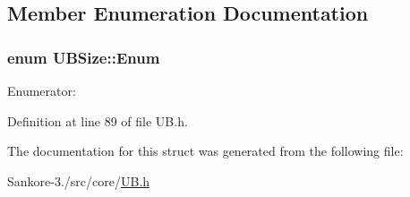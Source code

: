 \subsection{Member Enumeration Documentation}
\hypertarget{struct_u_b_size_a7ea37366b0131977382c1412689659a6}{
\subsubsection[{Enum}]{\setlength{\rightskip}{0pt plus 5cm}enum {\bf U\-B\-Size\-::\-Enum}}}\label{d5/d5e/struct_u_b_size_a7ea37366b0131977382c1412689659a6}
\begin{Desc}
\item[Enumerator\-: ]\par
\begin{description}
\item[{\em 
\hypertarget{struct_u_b_size_a7ea37366b0131977382c1412689659a6a0ac946f885859a3db87fef6e0a5411a6}{Small}\label{d5/d5e/struct_u_b_size_a7ea37366b0131977382c1412689659a6a0ac946f885859a3db87fef6e0a5411a6}
}]\item[{\em 
\hypertarget{struct_u_b_size_a7ea37366b0131977382c1412689659a6ac239b174a88775ab9862fc9043931d5d}{Medium}\label{d5/d5e/struct_u_b_size_a7ea37366b0131977382c1412689659a6ac239b174a88775ab9862fc9043931d5d}
}]\item[{\em 
\hypertarget{struct_u_b_size_a7ea37366b0131977382c1412689659a6af6e3d630c31d154e199dc809a08f9ea4}{Large}\label{d5/d5e/struct_u_b_size_a7ea37366b0131977382c1412689659a6af6e3d630c31d154e199dc809a08f9ea4}
}]\end{description}
\end{Desc}



Definition at line 89 of file U\-B.\-h.



The documentation for this struct was generated from the following file\-:\begin{DoxyCompactItemize}
\item 
Sankore-\/3./src/core/\hyperlink{_u_b_8h}{U\-B.\-h}\end{DoxyCompactItemize}
